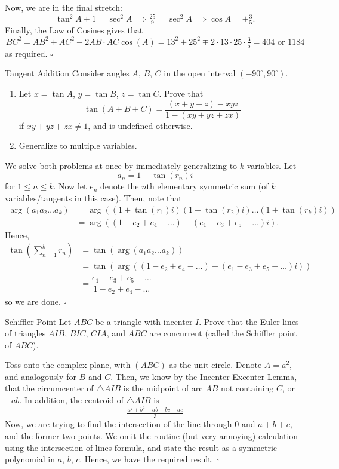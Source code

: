 \documentclass{article}
\begin{document}
Now, we are in the final stretch: \[\tan^2 A+1=\sec^2 A \implies \tfrac{25}{9} = \sec^2 A \implies \cos A = \pm \tfrac{3}{5}.\] Finally, the Law of Cosines gives that \[BC^2 = AB^2+AC^2-2AB\cdot AC\cos(A) = 13^2+25^2\mp2\cdot13\cdot25\cdot\tfrac{3}{5} = \boxed{404}\text{ or }\boxed{1184}\] as required. $\square$

\begin{problem}[6.39]{Tangent Addition}
Consider angles $A$, $B$, $C$ in the open interval $(-90^\circ, 90^\circ)$.
\begin{enumerate}[label=(\alph*)]
\item Let $x = \tan A$, $y = \tan B$, $z = \tan C$. Prove that \[\tan(A + B + C) = \dfrac{(x + y + z) - xyz}{1 - (xy + yz + zx)}\] if $xy + yz + zx \neq 1$, and is undefined otherwise.
\item Generalize to multiple variables.
\end{enumerate}
\end{problem}
We solve both problems at once by immediately generalizing to $k$ variables. Let \[a_n = 1+\tan(r_n)i\] for $1 \le n \le k$. Now let $e_n$ denote the $n$th elementary symmetric sum (of $k$ variables/tangents in this case). Then, note that 
\begin{align*}
\arg(a_1a_2\dots a_k) &= \arg((1+\tan(r_1)i)(1+\tan(r_2)i)\dots(1+\tan(r_k)i)) \\
&= \arg((1-e_2+e_4-\dots)+(e_1-e_3+e_5-\dots)i).
\end{align*}
Hence, 
\begin{align*}
\tan\left(\textstyle\sum_{n=1}^k r_n\right) &= \tan\left(\arg(a_1a_2\dots a_k)\right) \\
&= \tan(\arg((1-e_2+e_4-\dots)+(e_1-e_3+e_5-\dots)i)) \\
&= \dfrac{e_1-e_3+e_5-\dots}{1-e_2+e_4-\dots}
\end{align*}
so we are done. $\square$

\begin{problem}[6.40]{Schiffler Point}
Let $ABC$ be a triangle with incenter $I$. Prove that the Euler lines of triangles $AIB$, $BIC$, $CIA$, and $ABC$ are concurrent (called the Schiffler point of $ABC$).
\end{problem}
Toss onto the complex plane, with $(ABC)$ as the unit circle. Denote $A = a^2$, and analogously for $B$ and $C$. Then, we know by the Incenter-Excenter Lemma, that the circumcenter of $\triangle AIB$ is the midpoint of arc $AB$ not containing $C$, or $-ab$. In addition, the centroid of $\triangle AIB$ is \[\tfrac{a^2+b^2-ab-bc-ac}{3}\] Now, we are trying to find the intersection of the line through $0$ and $a+b+c$, and the former two points. We omit the routine (but very annoying) calculation using the intersection of lines formula, and state the result as a symmetric polynomial in $a$, $b$, $c$. Hence, we have the required result. $\square$
\end{document}
